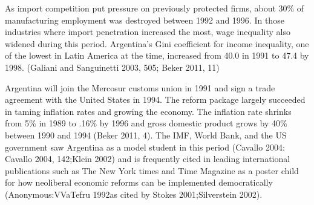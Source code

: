 \documentclass[a4paper]{article}\usepackage[]{graphicx}\usepackage[]{color}
\begin{document}
As import competition put pressure on previously protected firms, about 30\% of manufacturing employment was destroyed between 1992 and 1996. In those industries where import penetration increased the most, wage inequality also widened during this period. Argentina's Gini coefficient for income inequality, one of the lowest in Latin America at the time, increased from 40.0 in 1991 to 47.4 by 1998. (Galiani and Sanguinetti 2003, 505; Beker 2011, 11)

Argentina will join the Mercosur customs union in 1991 and sign a trade agreement with the United States in 1994. The reform package largely succeeded in taming inflation rates and growing the economy. The inflation rate shrinks from 5\% in 1989 to .16\% by 1996 and gross domestic product grows by 40\% between 1990 and 1994 (Beker 2011, 4). The IMF, World Bank, and the US government saw Argentina as a model student in this period (Cavallo 2004: Cavallo 2004, 142;Klein 2002) and is frequently cited in leading international publications such as The New York times and Time Magazine as a poster child for how neoliberal economic reforms can be implemented democratically (Anonymous:VVaTefru 1992as cited by Stokes 2001;Silverstein 2002).
\end{document}
